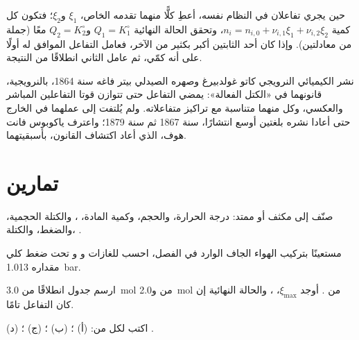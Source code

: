 \begin{method}\label{met:b1:extent-q-and-k:two-reactions}
حين يجري تفاعلان في النظام نفسه، أعطِ كلًّا منهما تقدمه الخاص،
$\xi_1$ و$\xi_2$؛ فتكون كل كمية $n_i = n_{i,0} + \nu_{i,1}\xi_1
+ \nu_{i,2}\xi_2$، وتحقق الحالة النهائية $Q_1 = K_1^\circ$
و$Q_2 = K_2^\circ$ معًا (جملة من معادلتين). وإذا كان أحد الثابتين أكبر
بكثير من الآخر، فعامل التفاعل الموافق له أولًا على أنه
كمّي، ثم عامل الثاني انطلاقًا من النتيجة.
\end{method}

\begin{history}
نشر الكيميائي النرويجي كاتو غولدبيرغ وصهره
الصيدلي بيتر فاغه سنة 1864، بالنرويجية، قانونهما في «الكتل
الفعالة»: يمضي التفاعل حتى تتوازن قوتا التفاعلين المباشر
والعكسي، وكل منهما متناسبة مع تراكيز
متفاعلاته. ولم يُلتفت إلى عملهما في الخارج حتى أعادا نشره بلغتين
أوسع انتشارًا، سنة 1867 ثم سنة 1879؛ واعترف ياكوبوس فانت هوف، الذي
أعاد اكتشاف القانون، بأسبقيتهما.
\end{history}

\section{تمارين}

\begin{exercise}[$\star$]\label{exo:b1:extent-q-and-k:1}
صنّف إلى مكثف أو ممتد: درجة الحرارة، والحجم، وكمية
المادة، ، والكتلة الحجمية، والضغط، والكتلة، .
\end{exercise}

\begin{exercise}[$\star$]\label{exo:b1:extent-q-and-k:2}
مستعينًا بتركيب الهواء الجاف الوارد في الفصل، احسب
 للغازات  و و تحت ضغط كلي
مقداره \qty{1.013}{bar}.
\end{exercise}

\begin{exercise}[$\star$]\label{exo:b1:extent-q-and-k:3}
ارسم جدول   انطلاقًا من \qty{3.0}{mol} من
 و\qty{2.0}{mol} من . أوجد $\xi_{\max}$، ، والحالة النهائية إن كان التفاعل تامًا.
\end{exercise}

\begin{exercise}[$\star$]\label{exo:b1:extent-q-and-k:4}
اكتب  لكل من: (أ) ؛
(ب) ؛ (ج) ؛ (د) .
\end{exercise}

